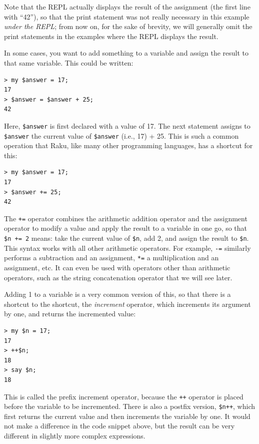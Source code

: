 Note that the REPL actually displays the result of the 
assignment (the first line with ``42''), so that the 
print statement was not really necessary in this 
example \emph{under the REPL}; from now on, for the sake of 
brevity, we will generally omit the print statements in the 
examples where the REPL displays the result.

In some cases, you want to add something to a variable 
and assign the result to that same variable. This could 
be written:

\begin{verbatim}
> my $answer = 17;
17
> $answer = $answer + 25;
42
\end{verbatim}
%

Here, \verb"$answer" is first declared with a value of 17. The next 
statement assigns to \verb"$answer" the current value of 
\verb"$answer" (i.e., 17) + 25. This is such a common operation 
that Raku, like many other programming languages, has a 
shortcut for this:

\begin{verbatim}
> my $answer = 17;
17
> $answer += 25;
42
\end{verbatim}
%

The \verb"+=" operator combines the arithmetic addition operator 
and the assignment operator to modify a value and apply the result 
to a variable in one go, so that \verb"$n += 2" means: take 
the current value of \verb"$n", add 2, and assign the result to 
\verb"$n". This syntax works with all other arithmetic operators. 
For example, \verb"-=" similarly performs a subtraction and an 
assignment, \verb"*=" a multiplication and an assignment, etc. It 
can even be used with operators other than arithmetic operators, 
such as the string concatenation operator that we will see later.

Adding 1 to a variable is a very common version of this, so that 
there is a shortcut to the shortcut, the \emph{increment} operator, 
which increments its argument by one, and returns the incremented value:

\begin{verbatim}
> my $n = 17;
17
> ++$n;
18
> say $n;
18
\end{verbatim}
%
This is called the prefix increment operator, because the \verb"++" 
operator is placed before the variable to be incremented. There is 
also a postfix version, \verb"$n++", which first returns the current 
value and then increments the variable by one. It would not make 
a difference in the code snippet above, but the result can be very different 
in slightly more complex expressions. 

